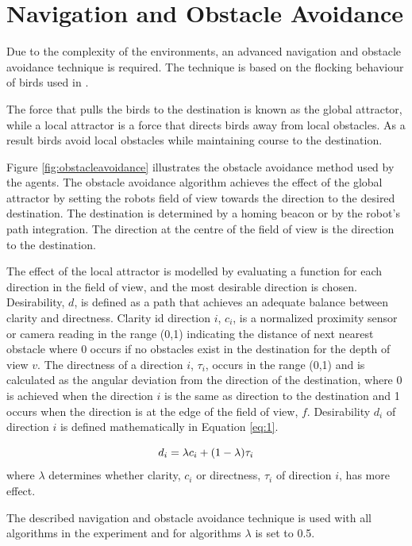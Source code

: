 \section{Navigation and Obstacle Avoidance}
\label{robots:obstacleavoidance}

Due to the complexity of the environments, an advanced navigation and obstacle avoidance technique is required.  The technique is based on the flocking behaviour of birds used in \cite{antoniou2012congestion}.

The force that pulls the birds to the destination is known as the global attractor, while a local attractor is a force that directs birds away from local obstacles. As a result birds avoid local obstacles while maintaining course to the destination. 

Figure \ref{fig:obstacleavoidance} illustrates the obstacle avoidance method used by the agents. The obstacle avoidance algorithm achieves the effect of the global attractor by setting the robots field of view towards the direction to the desired destination. The destination is determined by a homing beacon or by the robot's path integration. The direction at the centre of the field of view is the direction to the destination. 

The effect of the local attractor is modelled by evaluating a function for each direction in the field of view, and the most desirable direction is chosen. Desirability, $d$, is defined as a path that achieves an adequate balance between clarity and directness. Clarity id direction $i$, $c_i$, is a normalized proximity sensor or camera reading in the range (0,1) indicating the distance of next nearest obstacle where 0 occurs if no obstacles exist in the destination for the depth of view $v$. The directness of a direction $i$, $\tau_i$, occurs in the range (0,1) and is calculated as the angular deviation from the direction of the destination, where 0 is achieved when the direction $i$ is the same as direction to the destination and 1 occurs when the direction is at the edge of the field of view, $f$. Desirability $d_i$ of direction $i$ is defined mathematically in Equation \ref{eq:1}.

\begin{equation}
	d_i= \lambda c_i + (1 - \lambda)\tau_i \\
	\label{eq:1}
\end{equation} where $\lambda$ determines whether clarity, $c_i$ or directness, $\tau_i$ of direction $i$, has more effect.
 
The described navigation and obstacle avoidance technique is used with all algorithms in the experiment and for algorithms $\lambda$ is set to 0.5.

